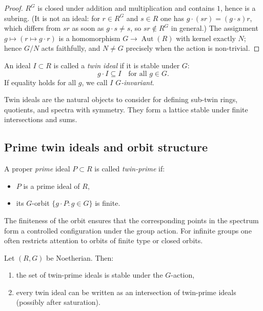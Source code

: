 \documentclass[11pt,a4paper]{article}
\numberwithin{equation}{section}
\DeclareMathOperator{\Aut}{Aut}
\begin{document}
	\begin{proof}
		$R^G$ is closed under addition and multiplication and contains $1$, hence is a subring. (It is not
		an ideal: for $r\in R^G$ and $s\in R$ one has $g\cdot(sr)=(g\cdot s)r$, which differs from $sr$ as
		soon as $g\cdot s\neq s$, so $sr\notin R^G$ in general.) The assignment $g\mapsto(r\mapsto g\cdot r)$
		is a homomorphism $G\to\Aut(R)$ with kernel exactly $N$; hence $G/N$ acts faithfully, and $N\neq G$
		precisely when the action is non-trivial.
	\end{proof}
	
	\begin{definition}
		An ideal $I\subset R$ is called a \emph{twin ideal} if it is stable under $G$:
		\[
		g\cdot I \subseteq I\quad\text{for all } g\in G.
		\]
		If equality holds for all $g$, we call $I$ \emph{$G$-invariant}.
	\end{definition}
	
	\begin{remark}
		Twin ideals are the natural objects to consider for defining sub-twin rings, quotients, and spectra with symmetry.
		They form a lattice stable under finite intersections and sums.
	\end{remark}
	
	\subsection{Prime twin ideals and orbit structure}
	
	\begin{definition}
		A proper \emph{prime} ideal $P\subset R$ is called \emph{twin-prime} if:
		\begin{itemize}
			\item $P$ is a prime ideal of $R$,
			\item its $G$-orbit $\{g\cdot P : g\in G\}$ is finite.
		\end{itemize}
	\end{definition}
	
	\begin{remark}
		The finiteness of the orbit ensures that the corresponding points in the spectrum form 
		a controlled configuration under the group action.
		For infinite groups one often restricts attention to orbits of finite type or closed orbits.
	\end{remark}
	
	\begin{proposition}
		Let $(R,G)$ be Noetherian.
		Then:
		\begin{enumerate}[label=(\alph*)]
			\item the set of twin-prime ideals is stable under the $G$-action,
			\item every twin ideal can be written as an intersection of twin-prime ideals (possibly after saturation).
		\end{enumerate}
	\end{proposition}
	
\end{document}
